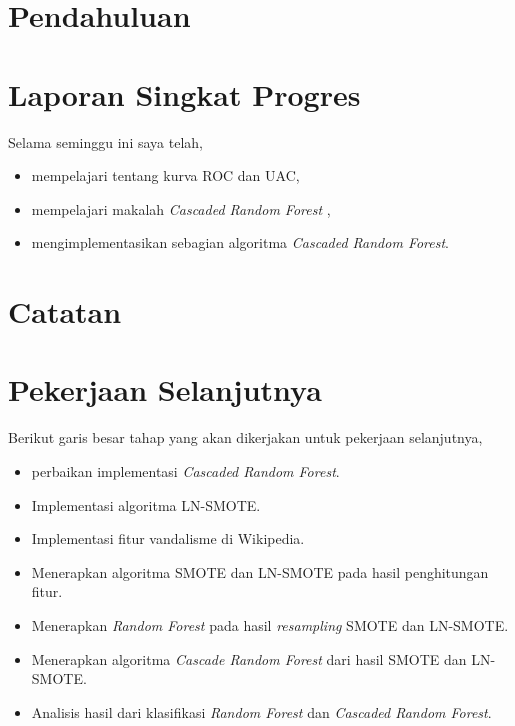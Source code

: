 






\section{Pendahuluan}




\section{Laporan Singkat Progres}

Selama seminggu ini saya telah,
\begin{itemize}
\item mempelajari tentang kurva ROC dan UAC,
\item mempelajari makalah \textit{Cascaded Random Forest}
\cite{baumann2013cascaded},
\item mengimplementasikan sebagian algoritma \textit{Cascaded Random Forest}.
\end{itemize}

\section{Catatan}




\clearpage
\section{Pekerjaan Selanjutnya}

Berikut garis besar tahap yang akan dikerjakan untuk pekerjaan selanjutnya,

\begin{itemize}
\item perbaikan implementasi \textit{Cascaded Random Forest}.
\item Implementasi algoritma LN-SMOTE.
\item Implementasi fitur vandalisme di Wikipedia.
\item Menerapkan algoritma SMOTE dan LN-SMOTE pada hasil penghitungan fitur.
\item Menerapkan \textit{Random Forest} pada hasil \textit{resampling} SMOTE
dan LN-SMOTE.
\item Menerapkan algoritma \textit{Cascade Random Forest} dari hasil SMOTE dan
LN-SMOTE.
\item Analisis hasil dari klasifikasi \textit{Random Forest} dan
\textit{Cascaded Random Forest}.
\end{itemize}

\clearpage
{}

\advisorsignature

\clearpage
{}
\printbibliography

\newpage
\appendix




